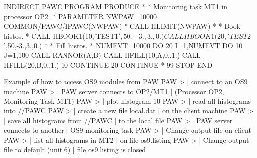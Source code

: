 \begin{XMP}
      INDIRECT PAWC
      PROGRAM PRODUCE
*
*        Monitoring task MT1 in processor OP2.
*
      PARAMETER NWPAW=10000
      COMMON/PAWC/IPAWC(NWPAW)
*
      CALL HLIMIT(NWPAW)
*
*       Book histos.
*
      CALL HBOOK1(10,'TEST1$',50,-3.,3.,0.)
      CALL HBOOK1(20,'TEST2$',50,-3.,3.,0.)
*
*       Fill histos.
*
      NUMEVT=10000
      DO 20 I=1,NUMEVT
         DO 10 J=1,100
            CALL RANNOR(A,B)
            CALL HFILL(10,A,0.,1.)
            CALL HFILL(20,B,0.,1.)
 10      CONTINUE
 20   CONTINUE
*
 99   STOP
      END
\end{XMP}
\begin{Fighere}
\caption{Visualising histograms on OS9 modules from PAW}
\end{Fighere}
\NODOC{\end{minipage}}
\bigskip
 
\begin{XMPt}{Example of how to access OS9 modules from PAW}
PAW >                             | connect to an OS9 machine
PAW >                       | PAW server connects to OP2/MT1
                                                 | (Processor OP2, Monitoring Task MT1)
PAW >                               | plot histogram 10
PAW >                                      | read all histograms into //PAWC
PAW >               | create a new file local.dat
                                                 | on the client machine
PAW >                                     | save all histograms from //PAWC
                                                 | to the local file
PAW >                       | PAW server connects to another
                                                 | OS9 monitoring task
PAW >                       | Change output file on client
PAW >                                 | list all histograms in MT2
                                                 | on file os9.listing
PAW >                                 | Change output file to default (unit 6)
                                                 | file os9.listing is closed
\end{XMPt}


